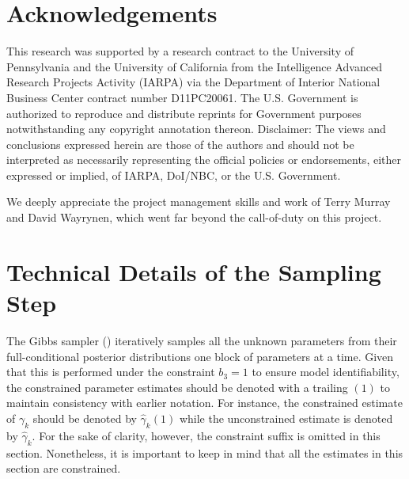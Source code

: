 \documentclass[aoas, preprint]{imsart}
\numberwithin{equation}{section}
\theoremstyle{plain}
\begin{document}
\section{Acknowledgements}
\noindent
This research was supported by a research contract to the University
of Pennsylvania and the University of California from the Intelligence Advanced Research Projects Activity
(IARPA) via the Department of Interior National Business Center
contract number D11PC20061. The U.S. Government is authorized to reproduce and
distribute reprints for Government purposes notwithstanding any
copyright annotation thereon. Disclaimer: The views and conclusions
expressed herein are those of the authors and should not be
interpreted as necessarily representing the official policies or
endorsements, either expressed or implied, of IARPA, DoI/NBC, or the
U.S. Government. 

We deeply appreciate the project management
skills and work of Terry Murray and David Wayrynen, which went far
beyond the call-of-duty on this project.


\appendix
\section{Technical Details of the Sampling Step}
\label{appendix}

The Gibbs sampler (\citet{geman1984stochastic}) iteratively samples all the unknown parameters from their full-conditional posterior distributions one block of parameters at a time. Given that this is performed under the constraint $b_3 = 1$ to ensure model identifiability, the constrained parameter estimates should be denoted with a trailing $(1)$ to maintain consistency with earlier notation. For instance, the constrained estimate of $\gamma_k$ should be denoted by $\hat{\gamma}_k(1)$ while the unconstrained estimate is denoted by $\hat{\gamma}_k$. For the sake of clarity, however, the constraint suffix is omitted in this section. Nonetheless, it is important to keep in mind that all the estimates in this section are constrained.
\end{document}
